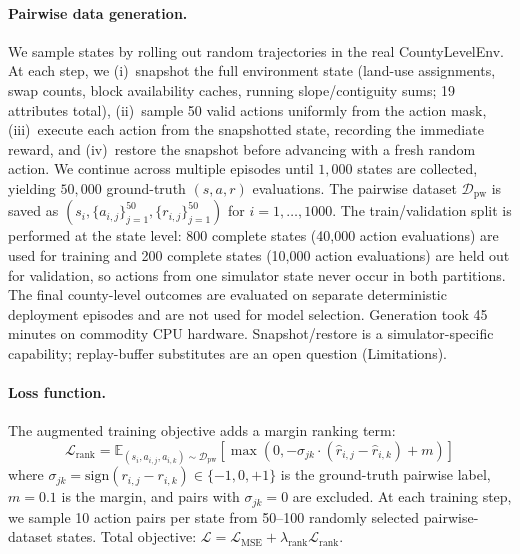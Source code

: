 \documentclass[11pt]{article}
\begin{document}
\paragraph{Pairwise data generation.} We sample states by rolling out random trajectories in the real CountyLevelEnv. At each step, we (i)~snapshot the full environment state (land-use assignments, swap counts, block availability caches, running slope/contiguity sums; 19 attributes total), (ii)~sample 50 valid actions uniformly from the action mask, (iii)~execute each action from the snapshotted state, recording the immediate reward, and (iv)~restore the snapshot before advancing with a fresh random action. We continue across multiple episodes until $1{,}000$ states are collected, yielding $50{,}000$ ground-truth $(s, a, r)$ evaluations. The pairwise dataset $\mathcal{D}_{\text{pw}}$ is saved as $(s_i, \{a_{i,j}\}_{j=1}^{50}, \{r_{i,j}\}_{j=1}^{50})$ for $i = 1, \ldots, 1000$. The train/validation split is performed at the state level: 800 complete states (40,000 action evaluations) are used for training and 200 complete states (10,000 action evaluations) are held out for validation, so actions from one simulator state never occur in both partitions. The final county-level outcomes are evaluated on separate deterministic deployment episodes and are not used for model selection. Generation took 45 minutes on commodity CPU hardware. Snapshot/restore is a simulator-specific capability; replay-buffer substitutes are an open question (Limitations).

\paragraph{Loss function.} The augmented training objective adds a margin ranking term:
\begin{equation*}
\mathcal{L}_{\text{rank}} = \mathbb{E}_{(s_i, a_{i,j}, a_{i,k}) \sim \mathcal{D}_{\text{pw}}} \left[ \max\left(0, -\sigma_{jk} \cdot (\hat{r}_{i,j} - \hat{r}_{i,k}) + m\right) \right]
\end{equation*}
where $\sigma_{jk} = \text{sign}(r_{i,j} - r_{i,k}) \in \{-1, 0, +1\}$ is the ground-truth pairwise label, $m = 0.1$ is the margin, and pairs with $\sigma_{jk} = 0$ are excluded. At each training step, we sample 10 action pairs per state from 50--100 randomly selected pairwise-dataset states. Total objective: $\mathcal{L} = \mathcal{L}_{\text{MSE}} + \lambda_{\text{rank}} \mathcal{L}_{\text{rank}}$.
\end{document}
